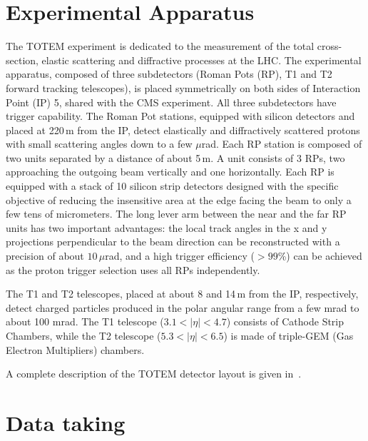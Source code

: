 \documentclass[TOTEM]{cern/cernphprep}
\begin{document}
\section{Experimental Apparatus}
%
The TOTEM experiment is dedicated to the measurement of the total 
cross-section, elastic scattering
and diffractive processes at the LHC. The experimental
apparatus, composed of three subdetectors
(Roman Pots (RP), T1 and T2 forward tracking telescopes), 
is placed symmetrically on both sides of Interaction Point (IP) 5, shared
with the CMS experiment. All three subdetectors have
trigger capability. The Roman Pot stations, equipped with
silicon detectors and placed at 220\,m from the IP,
detect elastically and diffractively scattered protons with
small scattering angles down to a few $\mu$rad. 
Each RP station is composed of two units separated
by a distance of about 5\,m. A unit consists of 3 RPs, two
approaching the outgoing beam vertically and one horizontally.
Each RP is equipped with a stack of 10 silicon
strip detectors designed with the specific objective of
reducing the insensitive area at the edge facing the beam
to only a few tens of micrometers. The long lever arm
between the near and the far RP units has two important
advantages: the local track angles in the x and y projections
perpendicular to the beam direction can be reconstructed
with a precision of about $10\,\mu$rad, and a high trigger efficiency
($> 99$\%) can be achieved as the proton trigger selection
uses all RPs independently.

The T1 and T2 telescopes, placed at about 8 and 14\,m from the IP, 
respectively, detect charged particles produced in the polar
angular range from a few mrad to about 100 mrad. The T1 telescope
($3.1 < |\eta| < 4.7$) consists of Cathode Strip Chambers,
while the T2 telescope ($5.3 < |\eta| < 6.5$) is made of
triple-GEM (Gas Electron Multipliers) chambers.

A complete description of the TOTEM detector layout is given in~\cite{jinst}.

\section{Data taking}
\end{document}
